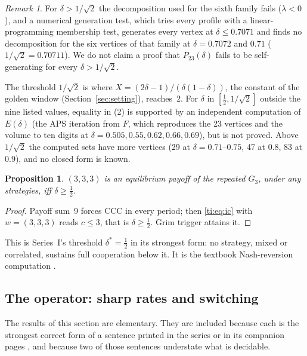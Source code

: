 \documentclass[11pt]{amsart}
\newtheorem{proposition}[theorem]{Proposition}
\theoremstyle{remark}
\newtheorem{remark}[theorem]{Remark}
\begin{document}
\begin{remark}\label{ti:rem:R8}
For $\delta>1/\sqrt2$ the decomposition used for the sixth family fails ($\lambda<0$), and a
numerical generation test, which tries every profile with a linear-programming membership test,
generates every vertex at $\delta\le0.7071$ and finds no decomposition for the six vertices of that
family at $\delta=0.7072$ and $0.71$ ($1/\sqrt2=0.70711$). We do not claim a proof that
$P_{23}(\delta)$ fails to be self-generating for every $\delta>1/\sqrt2$.
\end{remark}

The threshold $1/\sqrt2$ is where $X=(2\delta-1)/(\delta(1-\delta))$, the constant of the golden
window (Section~\ref{sec:setting}), reaches~2. For $\delta$ in $[\frac12,1/\sqrt2]$ outside the nine listed
values, equality in (2) is supported by an independent computation of $E(\delta)$ (the APS iteration
from $F$, which reproduces the 23 vertices and the volume to ten digits at
$\delta=0.505,0.55,0.62,0.66,0.69$), but is not proved. Above $1/\sqrt2$ the computed sets have more
vertices (29 at $\delta=0.71$--$0.75$, 47 at $0.8$, 83 at $0.9$), and no closed form is known.

\begin{proposition}\label{ti:prop:R4}
$(3,3,3)$ is an equilibrium payoff of the repeated $G_3$, under any strategies, iff $\delta\ge\frac12$.
\end{proposition}

\begin{proof}
Payoff sum~9 forces CCC in every period; then \eqref{ti:eq:ic} with $w=(3,3,3)$ reads $c\le3$, that
is $\delta\ge\frac12$. Grim trigger attains it.
\end{proof}

This is Series~I's threshold $\delta^*=\frac12$ in its strongest form: no strategy, mixed or
correlated, sustains full cooperation below it. It is the textbook Nash-reversion computation
\cite{Friedman71}.

\subsection{The operator: sharp rates and switching}\label{ti:sec:operator}

The results of this section are elementary. They are included because each is the strongest
correct form of a sentence printed in the series or in its companion pages \cite{roadmap}, and because two of
those sentences understate what is decidable.
\end{document}
